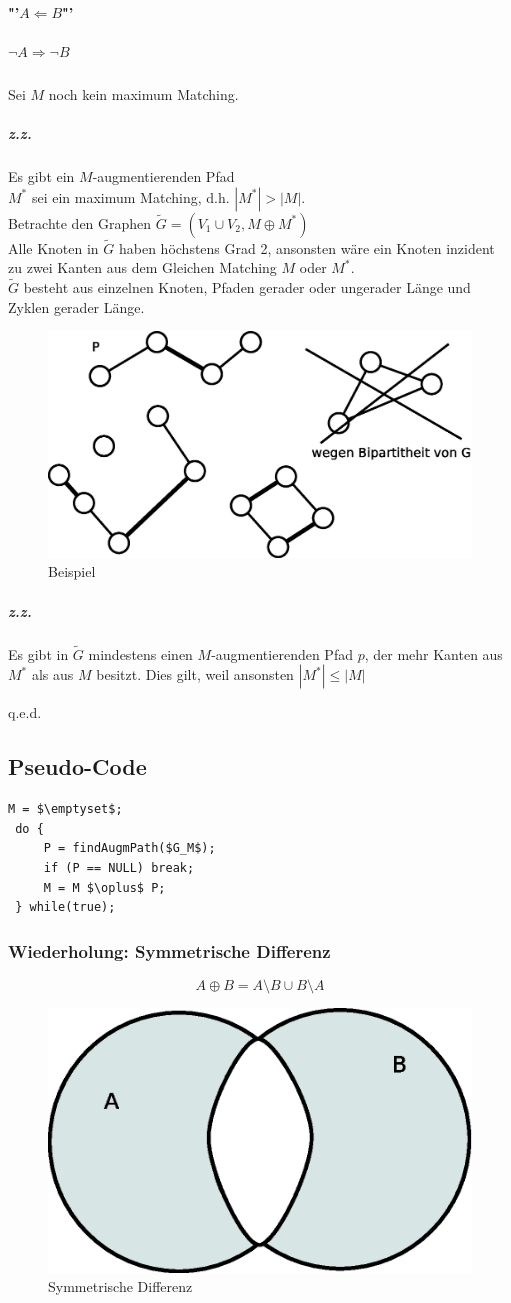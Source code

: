  \paragraph{"'$A\Leftarrow B$"'}
 \subparagraph{$\neg A \Rightarrow \neg B$}
 Sei $M$ noch kein maximum Matching.
 \subparagraph{z.z.} Es gibt ein $M$-augmentierenden Pfad\\
 $M^*$ sei ein maximum Matching, d.h. $|M^*| > |M|$.\\
 Betrachte den Graphen $\tilde{G} = (V_1\cup V_2, M\oplus M^*)$\\
 Alle Knoten in $\tilde{G}$ haben höchstens Grad 2, ansonsten wäre ein Knoten inzident zu zwei Kanten aus dem Gleichen Matching $M$ oder $M^*$.\\
 $\tilde{G}$ besteht aus einzelnen Knoten, Pfaden gerader oder ungerader Länge und Zyklen gerader Länge.
 \begin{figure}[H]
\centering
\includegraphics[width=0.3\linewidth]{23/Grafik/Diagramm7}
\caption{Beispiel}
\label{fig:Diagramm7}
\end{figure}

 \subparagraph{z.z.} Es gibt in $\tilde{G}$ mindestens einen $M$-augmentierenden Pfad $p$, der mehr Kanten aus $M^*$ als aus $M$ besitzt. Dies gilt, weil ansonsten $|M^*| \leq |M|$
 \begin{flushright}
 	q.e.d.
 \end{flushright}
 \subsection{Pseudo-Code}
 \begin{lstlisting}[style = pseudo]
 M = $\emptyset$;
 do {
	 P = findAugmPath($G_M$);
	 if (P == NULL) break;
	 M = M $\oplus$ P;
 } while(true);
 \end{lstlisting}
 \subsubsection{Wiederholung: Symmetrische Differenz}
 \[ A\oplus B = A\setminus B \cup B \setminus A \]
 \begin{figure}[H]
\centering
\includegraphics[width=0.3\linewidth]{23/Grafik/Diagramm9}
\caption{Symmetrische Differenz}
\label{fig:Diagramm9}
\end{figure}


